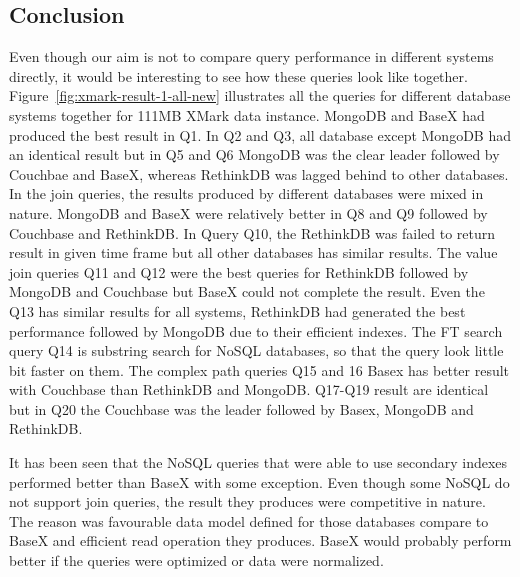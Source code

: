 \subsection{Conclusion}
Even though our aim is not to compare query performance in different systems directly, it would be interesting to see how these queries look like together. Figure~\ref{fig:xmark-result-1-all-new} illustrates all the queries for different database systems together for 111MB XMark data instance. MongoDB and BaseX had produced the best result in Q1. In Q2 and Q3, all database except MongoDB  had an identical result but in Q5 and Q6 MongoDB was the clear leader followed by Couchbae and BaseX, whereas RethinkDB was lagged behind to other databases. In the join queries, the results produced by different databases were mixed in nature. MongoDB and BaseX were relatively better in Q8 and Q9 followed by Couchbase and RethinkDB. In Query Q10, the RethinkDB was failed to return result in given time frame but all other databases has similar results. The value join queries Q11 and Q12 were the best queries for RethinkDB followed by MongoDB and Couchbase but BaseX could not complete the result. Even the Q13 has similar results for all systems, RethinkDB had generated the best performance followed by MongoDB due to their efficient indexes. The FT search query Q14 is substring search for NoSQL databases, so that the query look little bit faster on them. The complex path queries Q15 and 16 Basex has better result with Couchbase than RethinkDB and MongoDB.
Q17-Q19 result are identical but in Q20 the Couchbase was the leader followed by Basex, MongoDB and RethinkDB. 
\par
It has been seen that the NoSQL queries that were able to use secondary indexes performed better than BaseX with some exception. Even though some NoSQL do not support join queries, the result they produces were competitive in nature. The reason was favourable data model defined for those databases compare to BaseX and efficient read operation they produces. BaseX would probably perform better if the queries were optimized or data were normalized.

